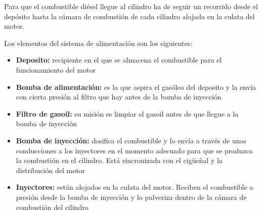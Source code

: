 \documentclass[a4paper,12pt,oneside]{article}
\begin{document}
Para que el combustible diésel llegue al cilindro ha de seguir un recorrido
desde el depósito hasta la cámara de combustión de cada cilindro alojada en la
culata del motor.

Los elementos del sistema de alimentación son los siguientes:
\begin{itemize}
\item \textbf{Deposito:} recipiente en el que se almacena el combustible para el
funcionamiento del motor
\item \textbf{Bomba de alimentación:} es la que aspira el gasóleo del deposito y la envía
con cierta presión al filtro que hay antes de la bomba de inyección
\item \textbf{Filtro de gasoil:} su misión es limpiar el gasoil antes de que llegue a la
bomba de inyección
\item \textbf{Bomba de inyección:} dosifica el combustible y lo envía a través de unas
conducciones a los inyectores en el momento adecuado para que se produzca la
combustión en el cilindro. Está sincronizada con el cigüeñal y la distribución
del motor
\item \textbf{Inyectores:} están alojados en la culata del motor. Reciben el combustible a presión desde la bomba de inyección y lo
pulveriza dentro de la cámara de combustión del cilindro
\end{itemize}
\end{document}

